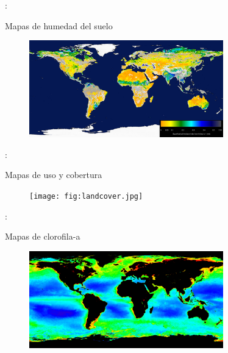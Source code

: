 \documentclass[aspectratio=169]{beamer}
\begin{document}
\begin{frame}{\secname : \subsecname}
    \begin{exampleblock}{Mapas de humedad del suelo \cite{web:smos}}
        \begin{figure}[h!]
            \centering
            \includegraphics[width=0.75\textwidth]{fig:smos.jpg}
            \label{fig:smos}
        \end{figure}
    \end{exampleblock}
\end{frame}

\begin{frame}{\secname : \subsecname}
    \begin{exampleblock}{Mapas de uso y cobertura \cite{web:lc}}
        \begin{figure}[h!]
            \centering
            \texttt{[image: fig:landcover.jpg]}
            \label{fig:landcover}
        \end{figure}
    \end{exampleblock}
\end{frame}

\begin{frame}{\secname : \subsecname}
    \begin{exampleblock}{Mapas de clorofila-a \cite{web:lc}}
        \begin{figure}[h!]
            \centering
            \includegraphics[width=0.75\textwidth]{fig:chl.png}
            \label{fig:chl}
        \end{figure}
    \end{exampleblock}
\end{frame}
\end{document}

